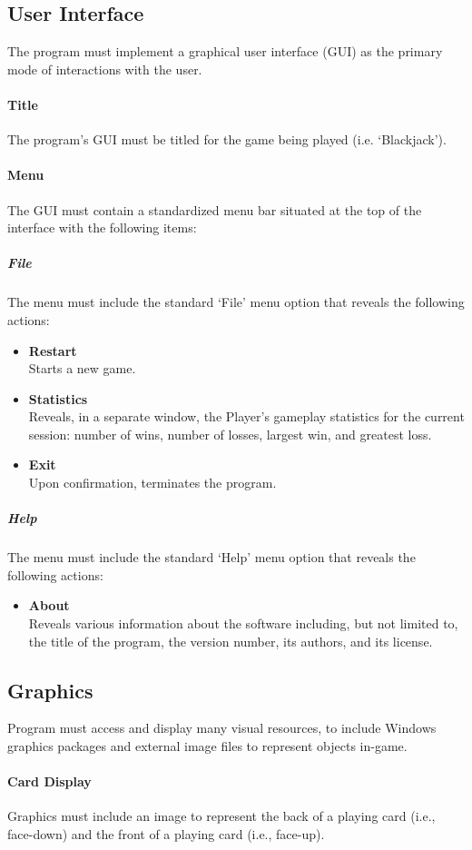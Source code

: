 \documentclass[12pt]{article}
\begin{document}
\subsection{User Interface}
The program must implement a graphical user interface (GUI) as the primary mode
of interactions with the user.
\paragraph{Title}
The program's GUI must be titled for the game being played (i.e. `Blackjack').
\paragraph{Menu}
The GUI must contain a standardized menu bar situated at the top of the
interface with the following items:
\subparagraph{File}
The menu must include the standard `File' menu option that reveals the
following actions:
\begin{itemize}
\item \textbf{Restart} \\ Starts a new game.
\item \textbf{Statistics} \\ Reveals, in a separate window, the Player's
gameplay statistics for the current session: number of wins, number of losses,
largest win, and greatest loss.
\item \textbf{Exit} \\ Upon confirmation, terminates the program.
\end{itemize}
\subparagraph{Help}
The menu must include the standard `Help' menu option that reveals the
following actions:
\begin{itemize}
\item \textbf{About} \\ Reveals various information about the software
including, but not limited to, the title of the program, the version number,
its authors, and its license.
\end{itemize}

\subsection{Graphics}
Program must access and display many visual resources, to include Windows
graphics packages and external image files to represent objects in-game.
\paragraph{Card Display}
Graphics must include an image to represent the back of a playing card (i.e.,
face-down) and the front of a playing card (i.e., face-up).
\end{document}
